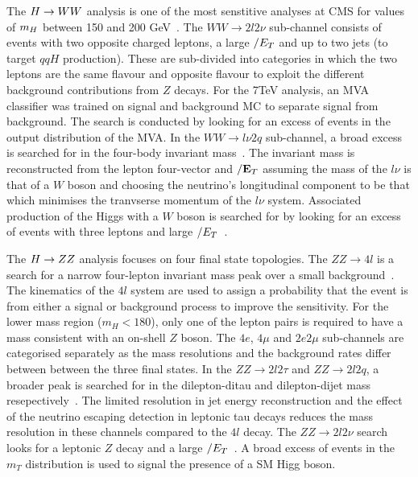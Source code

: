 The $H\rightarrow WW$ analysis is one of the most senstitive analyses at CMS for
values of $m_{H}$ between 150 and 200 GeV~\cite{HIG-12-017}. 
The $WW\rightarrow2l2\nu$ sub-channel consists of events with 
two opposite charged leptons, a large $\slash{E_{T}}$ and up 
to two jets (to target $qqH$ production).
These are sub-divided into categories in which the two leptons
are the same flavour and opposite flavour to exploit the different
background contributions from $Z$ decays. For the 7TeV analysis,
an MVA classifier was trained on signal and background 
MC to separate signal from background. The search is conducted by looking 
for an excess of events in the output distribution of the MVA.
In the $WW\rightarrow l\nu 2q$ sub-channel, a broad excess is searched
for in the four-body invariant mass~\cite{HIG-12-021}. 
The invariant mass is reconstructed from the lepton four-vector and $\slash{\mathbf{E}_{T}}$ 
assuming the mass of the $l\nu$ is that of a $W$ boson and 
choosing the neutrino's longitudinal component to be that which minimises 
the tranvserse momentum of the $l\nu$ system.
Associated production of the Higgs with a $W$ boson is searched for 
by looking for an excess of events with three leptons and large 
$\slash{E_{T}}$~\cite{HIG-11-034}.

The $H\rightarrow ZZ$ analysis focuses on four final state topologies.
The $ZZ\rightarrow 4l$ is a search for a narrow four-lepton invariant mass 
peak over a small background~\cite{HIG-12-016}. The kinematics of the $4l$ system are used
to assign a probability that the event is from either a signal or background 
process to improve the sensitivity. For the lower mass region ($m_{H}<180$),
only one of the lepton pairs is required to have a mass consistent with an 
on-shell $Z$ boson.
The $4e$, $4\mu$ and $2e2\mu$ sub-channels are categorised separately as the 
mass resolutions and the background rates differ between between the three 
final states. In the $ZZ\rightarrow 2l2\tau$ and $ZZ\rightarrow 2l2q$, 
a broader peak is searched for in the dilepton-ditau and dilepton-dijet
mass resepectively~\cite{HIG-12-016,HIG-11-027}. 
The limited resolution in jet energy reconstruction
and the effect of the neutrino escaping detection in leptonic tau decays
reduces the mass resolution in these channels compared to the $4l$ decay.
The $ZZ\rightarrow 2l2\nu$ search looks for a leptonic $Z$ decay
and a large $\slash{E_{T}}$~\cite{HIG-12-023}. A broad excess of events in the $m_{T}$ distribution
is used to signal the presence of a SM Higg boson.


